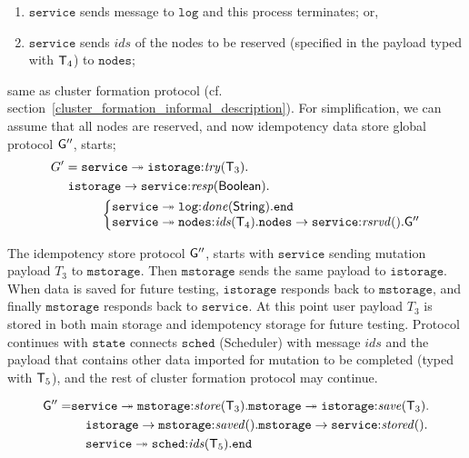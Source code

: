 \begin{enumerate}[start=1,label={(\bfseries \arabic*)}]
	\item $\mathtt{service}$ sends message to $\mathtt{log}$ and this process terminates; or,
	\item $\mathtt{service}$ sends $\mathit{ids}$ of the nodes to be reserved (specified in the payload typed with ${\mathsf T}_4$) to $\mathtt{nodes}$;
\end{enumerate}

\noindent
same as cluster formation protocol (cf. section~\ref{cluster_formation_informal_description}). For simplification, we can assume that all nodes are reserved, and now idempotency data store global protocol ${\sf G}''$, starts;
\begin{align*}
G' & = 
\mathtt{service} \twoheadrightarrow \mathtt{istorage}{:}\mathit{try}(\T_3). \\
& \hspace{1mm}
\mathtt{istorage} \to \mathtt{service}{:}\mathit{resp}(\mathsf{Boolean}).\\
& \hspace{10mm}
\left\{
\begin{array}{@{}l@{}}
\mathtt{service} \twoheadrightarrow\mathtt{log}{:} \mathit{done}(\mathsf{String}).\tend\\
\mathtt{service} \twoheadrightarrow\mathtt{nodes}{:}\mathit{ids}(\T_4).
\mathtt{nodes} \to \mathtt{service}{:}\mathit{rsrvd}().\G''
\end{array} \right.
\end{align*}

\noindent
The idempotency store protocol ${\sf G}''$, starts with $\mathtt{service}$ sending mutation payload $T_3$ to $\mathtt{mstorage}$. Then $\mathtt{mstorage}$ sends the same payload to $\mathtt{istorage}$. When data is saved for future testing, $\mathtt{istorage}$ responds back to $\mathtt{mstorage}$, and finally $\mathtt{mstorage}$ responds back to $\mathtt{service}$. At this point user payload $T_3$ is stored in both main storage and idempotency storage for future testing. Protocol continues with $\mathtt{state}$ connects $\mathtt{sched}$ (Scheduler) with message $\mathit{ids}$ and the payload that contains other data imported for mutation to be completed (typed with ${\mathsf T}_5$), and the rest of cluster formation protocol may continue.

\begin{align*}
{\sf G}'' = & 
\mathtt{service} \twoheadrightarrow \mathtt{mstorage}{:}\mathit{store}({\mathsf T}_3).
\mathtt{mstorage} \twoheadrightarrow \mathtt{istorage}{:}\mathit{save}({\mathsf T}_3).\\
& \hspace{4mm}
\mathtt{istorage} \to \mathtt{mstorage}{:}\mathit{saved}().
\mathtt{mstorage} \to \mathtt{service}{:}\mathit{stored}().\\
& \hspace{4mm}
\mathtt{service} \twoheadrightarrow \mathtt{sched}{:}\mathit{ids}({\mathsf T}_5).\mathtt{end}
\end{align*}

